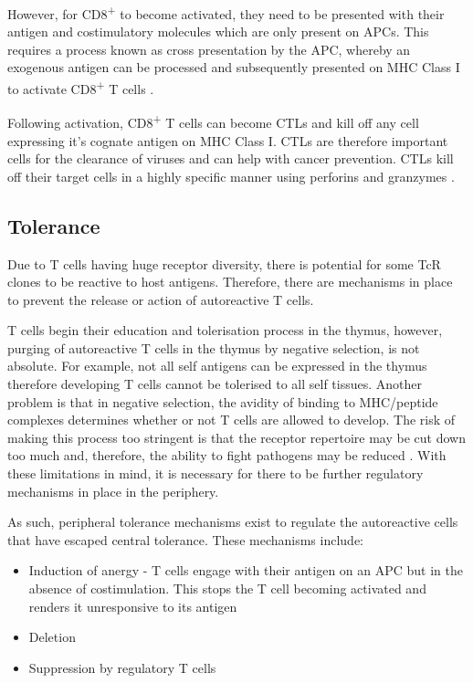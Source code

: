 However, for CD8\textsuperscript{+} to become activated, they need to be presented with their antigen and costimulatory molecules which are only present on APCs.
This requires a process known as cross presentation by the APC, whereby an exogenous antigen can be processed and subsequently presented on MHC Class I to activate CD8\textsuperscript{+} T cells \citep{Rock2005}.

Following activation, CD8\textsuperscript{+} T cells can become CTLs and kill off any cell expressing it's cognate antigen on MHC Class I.
CTLs are therefore important cells for the clearance of viruses and can help with cancer prevention.
CTLs kill off their target cells in a highly specific manner using perforins and granzymes \citep{Janeway2001}.













\subsection{Tolerance}
\label{subsec:Tcelltolerance}

Due to T cells having huge receptor diversity, there is potential for some TcR clones to be reactive to host antigens.
Therefore, there are mechanisms in place to prevent the release or action of autoreactive T cells.

T cells begin their education and tolerisation process in the thymus, however, purging of autoreactive T cells in the thymus by negative selection, is not absolute.
For example, not all self antigens can be expressed in the thymus therefore developing T cells cannot be tolerised to all self tissues.
Another problem is that in negative selection, the avidity of binding to MHC/peptide complexes determines whether or not T cells are allowed to develop.
The risk of making this process too stringent is that the receptor repertoire may be cut down too much and, therefore, the ability to fight pathogens may be reduced \citep{Walker2002}.
With these limitations in mind, it is necessary for there to be further regulatory mechanisms in place in the periphery.

As such, peripheral tolerance mechanisms exist to regulate the autoreactive cells that have escaped central tolerance.
These mechanisms include:
\begin{itemize}
\item Induction of anergy - T cells engage with their antigen on an APC but in the absence of costimulation. This stops the T cell becoming activated and renders it unresponsive to its antigen \citep{Abbas2004}
\item Deletion \citep{Abbas2004}
\item Suppression by regulatory T cells \citep{Abbas2004}
\end{itemize}

